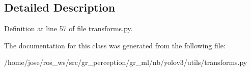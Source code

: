 \subsection{Detailed Description}


Definition at line 57 of file transforms.\+py.



The documentation for this class was generated from the following file\+:\begin{DoxyCompactItemize}
\item 
/home/jose/ros\+\_\+ws/src/gr\+\_\+perception/gr\+\_\+ml/nb/yolov3/utils/transforms.\+py\end{DoxyCompactItemize}
